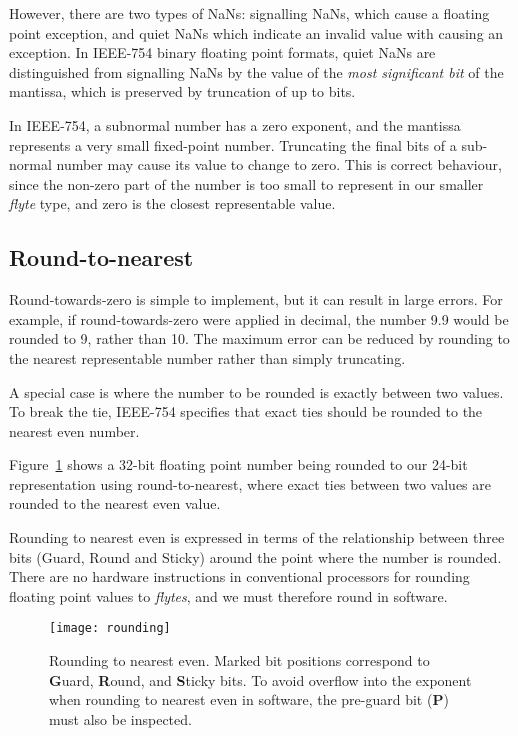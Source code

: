\documentclass{sig-alternate-05-2015}
\begin{document}
However, there are two types of NaNs: signalling NaNs, which cause a floating
point exception, and quiet NaNs which indicate an invalid value with causing an
exception. In IEEE-754 binary floating point formats, quiet NaNs are
distinguished from signalling NaNs by the value of the \emph{most significant
bit} of the mantissa, which is preserved by truncation of up to  bits.

In IEEE-754, a subnormal number has a zero exponent, and the mantissa
represents a very small fixed-point number. Truncating the final bits of a
sub-normal number may cause its value to change to zero. This is correct
behaviour, since the non-zero part of the number is too small to represent in
our smaller \textit{flyte} type, and zero is the closest representable value.


\subsection{Round-to-nearest}

Round-towards-zero is simple to implement, but it can result in large errors.
For example, if round-towards-zero were applied in decimal, the number 9.9
would be rounded to 9, rather than 10. The maximum error can be reduced by
rounding to the nearest representable number rather than simply truncating.

A special case is where the number to be rounded is exactly between two values.
To break the tie, IEEE-754 specifies that exact ties should be rounded to the
nearest even number.

Figure~\ref{fig:rounding} shows a 32-bit floating point number being rounded to
our 24-bit representation using round-to-nearest, where exact ties between two
values are rounded to the nearest even value.

Rounding to nearest even is expressed in terms of the relationship between
three bits (Guard, Round and Sticky) around the point where the number is
rounded. There are no hardware instructions in conventional processors for
rounding floating point values to \textit{flytes}, and we must therefore round
in software.

\begin{figure}[h]
\centering\texttt{[image: rounding]}
\caption{Rounding to nearest even. Marked bit positions correspond to
\textbf{G}uard, \textbf{R}ound, and \textbf{S}ticky bits. To avoid
overflow into the exponent when rounding to nearest even in
software, the pre-guard bit (\textbf{P}) must also be inspected.}
\label{fig:rounding}
\end{figure}
\end{document}
